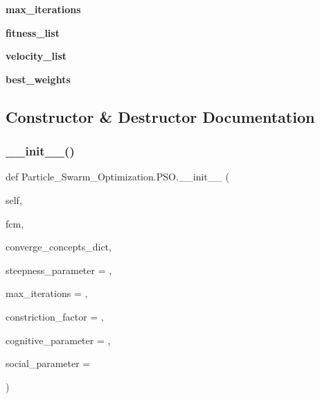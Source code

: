 \begin{DoxyCompactItemize}
{\bfseries max\+\_\+iterations}
\item 
\hypertarget{class_particle___swarm___optimization_1_1_p_s_o_ae6a19613b5aaa8ec64fcf4b7c27743a1}{}\label{class_particle___swarm___optimization_1_1_p_s_o_ae6a19613b5aaa8ec64fcf4b7c27743a1} 
{\bfseries fitness\+\_\+list}
\item 
\hypertarget{class_particle___swarm___optimization_1_1_p_s_o_a04d287712fa8a98e8482dccf35dbc562}{}\label{class_particle___swarm___optimization_1_1_p_s_o_a04d287712fa8a98e8482dccf35dbc562} 
{\bfseries velocity\+\_\+list}
\item 
\hypertarget{class_particle___swarm___optimization_1_1_p_s_o_a079f0fb7cd69fde03cbe5409c9113cf7}{}\label{class_particle___swarm___optimization_1_1_p_s_o_a079f0fb7cd69fde03cbe5409c9113cf7} 
{\bfseries best\+\_\+weights}
\end{DoxyCompactItemize}


\subsection{Constructor \& Destructor Documentation}
\hypertarget{class_particle___swarm___optimization_1_1_p_s_o_add702c734a63162dbe1cbfd6f94f26f7}{}\label{class_particle___swarm___optimization_1_1_p_s_o_add702c734a63162dbe1cbfd6f94f26f7} 
\subsubsection{\texorpdfstring{\+\_\+\+\_\+init\+\_\+\+\_\+()}{\_\_init\_\_()}}
{\footnotesize\ttfamily def Particle\+\_\+\+Swarm\+\_\+\+Optimization.\+P\+S\+O.\+\_\+\+\_\+init\+\_\+\+\_\+ (\begin{DoxyParamCaption}\item[{}]{self,  }\item[{}]{fcm,  }\item[{}]{converge\+\_\+concepts\+\_\+dict,  }\item[{}]{steepness\+\_\+parameter = {},  }\item[{}]{max\+\_\+iterations = {},  }\item[{}]{constriction\+\_\+factor = {},  }\item[{}]{cognitive\+\_\+parameter = {},  }\item[{}]{social\+\_\+parameter = {} }\end{DoxyParamCaption})}

